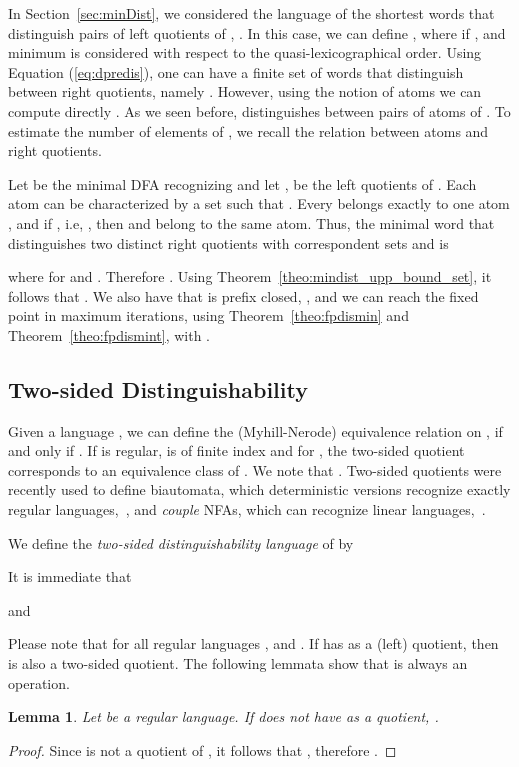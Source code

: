 \documentclass{article}
\newtheorem{lemma}{Lemma}
\newcommand{\dfa}{DFA\xspace}
\newcommand{\nfas}{NFAs\xspace}
\begin{document}
In Section~\ref{sec:minDist}, we considered the language of the shortest words that distinguish pairs of left quotients of , . 
In this case, we can define , where
 if , and minimum is considered with respect to the quasi-lexicographical order. 
Using Equation (\ref{eq:dpredis}), one can have a finite set of words that distinguish between right quotients, namely .
However, using the notion of atoms we can compute directly .
As we seen before,  distinguishes between pairs of atoms of . To estimate the number of elements of , we recall the relation between atoms and right quotients.

 Let  be the minimal \dfa recognizing  and let ,  be the left quotients of . 
Each atom can be characterized by a set  such that 
.
Every   belongs exactly to one atom , and if , i.e, , 
then  and  belong to the same atom. 
Thus, the minimal word that distinguishes two distinct right quotients with correspondent  sets  and  is 
 
where  for  and . 
Therefore . 
Using Theorem~\ref{theo:mindist_upp_bound_set}, it follows that . 
We also have that  is prefix closed, ,  
and we can reach the fixed point in maximum  iterations, using Theorem~\ref{theo:fpdismin} and 
Theorem~\ref{theo:fpdismint}, with  .

\subsection{Two-sided Distinguishability}
\label{sec:twosideddis}
Given a language , we can define the (Myhill-Nerode) equivalence relation on , 
 if and only if 
. If  is regular,  is of finite index and for , the two-sided quotient  corresponds to an equivalence class of .
We note that .
Two-sided quotients were recently used to define biautomata, which deterministic versions recognize exactly regular languages,~\cite{holzer13:_nondet_biaut_and_their_descr_compl,klima12:_biaut}, and \emph{couple} \nfas,
  which can recognize linear languages,~\cite{champarnaud13:_two_sided_deriv_for_regul}.

We define
the \emph{two-sided distinguishability language} of  by 

\noindent It is immediate that 

and


Please note that  for all regular languages ,  and  . 
If  has  as a (left) quotient, then  is also a two-sided quotient. 
The following lemmata show that  is always an  operation.

\begin{lemma}
\label{lem:qinf}
Let  be a regular language. If  does not have  as a quotient, .
\end{lemma}
\begin{proof} 
Since  is not a quotient of , it follows that  , therefore .
\end{proof}
\end{document}
